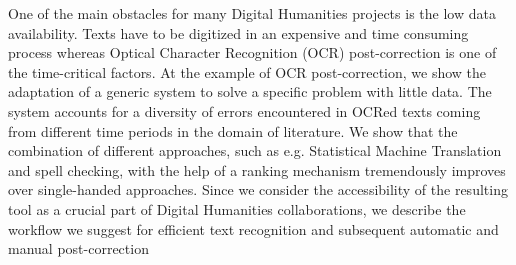 One of the main obstacles for many Digital Humanities projects is the low data availability. Texts have to be digitized in an expensive and time consuming process whereas Optical Character Recognition (OCR) post-correction is one of the time-critical factors. At the example of OCR post-correction, we show the adaptation of a generic system to solve a specific problem with little data. The system accounts for a diversity of errors encountered in OCRed texts coming from different time periods in the domain of literature. We show that the combination of different approaches, such as e.g. Statistical Machine Translation and spell checking, with the help of a ranking mechanism tremendously improves over single-handed approaches. Since we consider the accessibility of the resulting tool as a crucial part of Digital Humanities collaborations, we describe the workflow we suggest for efficient text recognition and subsequent automatic and manual post-correction

